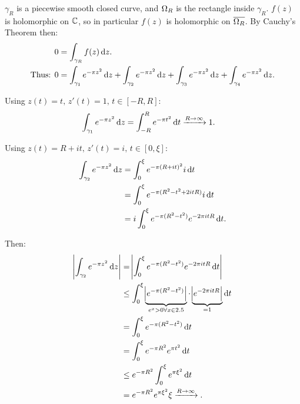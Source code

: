 \begin{example}
\begin{center}
\end{center}

$\gamma_R$ is a piecewise smooth closed curve, and $\Omega_R$ is the rectangle inside $\gamma_R$. $f(z)$ is holomorphic on $\mathbb{C}$, so in particular $f(z)$ is holomorphic on $\overline{\Omega_R}$. By Cauchy's Theorem then:
\begin{align*}
      0  &= \int_{\gamma_R} f(z) \dif z.\\
    \text{Thus: } 0 &= \int_{\gamma_1} e^{-\pi z^2} \dif z + \int_{\gamma_2} e^{-\pi z^2} \dif z + \int_{\gamma_3} e^{-\pi z^2} \dif z + \int_{\gamma_4} e^{-\pi z^2} \dif z.
\end{align*}

Using $z(t) = t, \, z'(t) = 1,  \, t \in [-R,R]$:
\begin{align*}
    \int_{\gamma_1} e^{-\pi z^2} \dif z = \int_{-R}^R e^{-\pi t^2}  \dif t & \xrightarrow{R\to \infty} 1.
\end{align*}

Using $z(t) = R + it, \, z'(t) = i,  \, t \in [0,\xi]$:
\begin{align*}
    \int_{\gamma_2} e^{-\pi z^2} \dif z &= \int_{0}^\xi e^{-\pi (R+it)^2} i \dif t \\ 
    &= \int_{0}^\xi e^{-\pi (R^2-t^2+2itR)} i \dif t\\
    &= i \int_{0}^\xi e^{-\pi (R^2-t^2)} e^{-2 \pi i t R}  \dif t.
\end{align*}

Then:
\begin{align*}
    \abs{\int_{\gamma_2} e^{-\pi z^2} \dif z} &= \abs{\int_{0}^\xi e^{-\pi (R^2-t^2)} e^{-2 \pi i t R}  \dif t}\\
    & \leq \int_{0}^\xi \underbrace{\abs{ e^{-\pi (R^2-t^2)} }}_{e^x > 0 \forall x \in \R} \cdot \underbrace{ \abs{e^{-2 \pi i t R} }}_{=1} \dif t\\
    &= \int_{0}^\xi e^{-\pi (R^2-t^2)}  \dif t \\ &= \int_{0}^\xi e^{-\pi R^2} e^{\pi t^2}  \dif t \\ 
    & \leq e^{-\pi R^2}  \int_{0}^\xi e^{\pi \xi^2} \dif t \\ &= e^{-\pi R^2} e^{\pi \xi^2} \xi \xrightarrow{R\to \infty} .
\end{align*}


\end{example}
